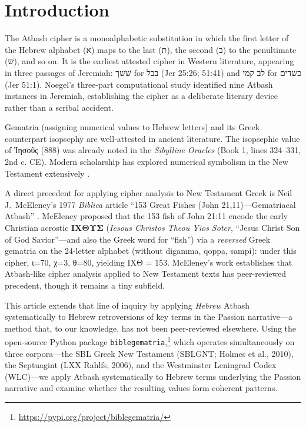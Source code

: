 \documentclass[12pt,a4paper]{article}
\begin{document}
\section{Introduction}

The Atbash cipher is a monoalphabetic substitution in which the first letter of the Hebrew alphabet (א) maps to the last (ת), the second (ב) to the penultimate (ש), and so on. It is the earliest attested cipher in Western literature, appearing in three passages of Jeremiah: שׁשׁך for בבל (Jer 25:26; 51:41) and לב קמי for כשדים (Jer 51:1). Noegel's three-part computational study \parencite{noegel1996} identified nine Atbash instances in Jeremiah, establishing the cipher as a deliberate literary device rather than a scribal accident.

Gematria (assigning numerical values to Hebrew letters) and its Greek counterpart isopsephy are well-attested in ancient literature. The isopsephic value of Ἰησοῦς (888) was already noted in the \textit{Sibylline Oracles} (Book 1, lines 324--331, 2nd c. CE). Modern scholarship has explored numerical symbolism in the New Testament extensively \parencite{dornseiff1925, kalvesmaki2013, bauckham1993, fideler1993, zeichmann2025, harris2024}.

A direct precedent for applying cipher analysis to New Testament Greek is Neil J.~McEleney's 1977 \textit{Biblica} article ``153 Great Fishes (John 21,11)---Gematriacal Atbash'' \parencite{mceleney1977}. McEleney proposed that the 153 fish of John 21:11 encode the early Christian acrostic \textbf{ΙΧΘΥΣ} (\textit{Iesous Christos Theou Yios Soter}, ``Jesus Christ Son of God Savior''---and also the Greek word for ``fish'') via a \textit{reversed} Greek gematria on the 24-letter alphabet (without digamma, qoppa, sampi): under this cipher, ι=70, χ=3, θ=80, yielding ΙΧΘ = 153. McEleney's work establishes that Atbash-like cipher analysis applied to New Testament texts has peer-reviewed precedent, though it remains a tiny subfield.

This article extends that line of inquiry by applying \textit{Hebrew} Atbash systematically to Hebrew retroversions of key terms in the Passion narrative---a method that, to our knowledge, has not been peer-reviewed elsewhere. Using the open-source Python package \texttt{biblegematria},\footnote{\url{https://pypi.org/project/biblegematria/}} which operates simultaneously on three corpora---the SBL Greek New Testament (SBLGNT; Holmes et al., 2010), the Septuagint (LXX Rahlfs, 2006), and the Westminster Leningrad Codex (WLC)---we apply Atbash systematically to Hebrew terms underlying the Passion narrative and examine whether the resulting values form coherent patterns.
\end{document}
